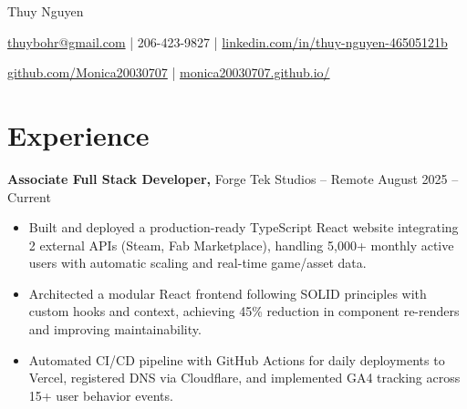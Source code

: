 \documentclass[11pt]{article}       %
\begin{document}
\centerline{\Huge Thuy Nguyen}

\vspace{5pt}

\centerline{\href{mailto:thuybohr@gmail.com}{thuybohr@gmail.com} | 206-423-9827 |
\href{https://www.linkedin.com/in/thuy-nguyen-46505121b/}{linkedin.com/in/thuy-nguyen-46505121b}}

\centerline{\href{https://github.com/Monica20030707}{github.com/Monica20030707} |
\href{https://monica20030707.github.io/}{monica20030707.github.io/}}

\vspace{-9pt}

\section*{Experience}

\textbf{Associate Full Stack Developer,} {Forge Tek Studios} -- Remote \hfill August 2025 -- Current
\vspace{-9pt}
\begin{itemize}
  \item Built and deployed a production-ready TypeScript React website integrating 2 external APIs (Steam, Fab Marketplace), handling 5,000+ monthly active users with automatic scaling and real-time game/asset data.
  \item Architected a modular React frontend following SOLID principles with custom hooks and context, achieving 45\% reduction in component re-renders and improving maintainability.
  \item Automated CI/CD pipeline with GitHub Actions for daily deployments to Vercel, registered DNS via Cloudflare, and implemented GA4 tracking across 15+ user behavior events.
\end{itemize}
\end{document}
